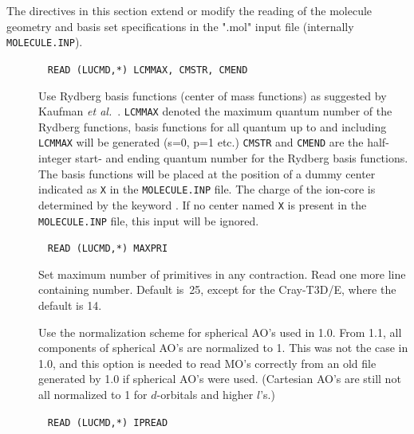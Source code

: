 The directives in this section extend or modify the reading of the molecule geometry and basis set
specifications in the ".mol" input file (internally \verb|MOLECULE.INP|).

\begin{description}
\item[]\verb| |\newline
\verb|READ (LUCMD,*) LCMMAX, CMSTR, CMEND|

Use Rydberg basis functions
(center of mass functions) as suggested by
Kaufman {\it et al.\/}~\cite{kkwbmjjpbamop22}. \verb|LCMMAX| denoted
the maximum quantum number of the Rydberg functions, basis functions
for all quantum up to and including \verb|LCMMAX| will be generated
(s=0, p=1 etc.) \verb|CMSTR| and \verb|CMEND| are the half-integer
start- and ending quantum number for the Rydberg basis functions. The
basis functions will be placed at the position of a dummy center
indicated as \verb|X| in the \verb|MOLECULE.INP| file. The charge of
the ion-core is determined by the keyword . If no center
named \verb|X| is present in the \verb|MOLECULE.INP| file,
this input will be ignored.

\item[]\verb| |\newline
\verb|READ (LUCMD,*) MAXPRI|

Set maximum number of primitives in any
contraction.  Read one more line containing number.  Default
is~25, except for the Cray-T3D/E, where the default is 14.


\item[] Use the normalization scheme for spherical AO's used in {\dalton} 1.0.
From {\dalton} 1.1, all components of spherical AO's are normalized to 1.
This was not the case in {\dalton} 1.0, and this option is needed to read 
MO's correctly from an old file generated by {\dalton} 1.0 if spherical AO's were used.
(Cartesian AO's are still not all normalized to 1 for $d$-orbitals and higher $l$'s.)

\item[]\verb| |\newline
\verb|READ (LUCMD,*) IPREAD|


\end{description}
